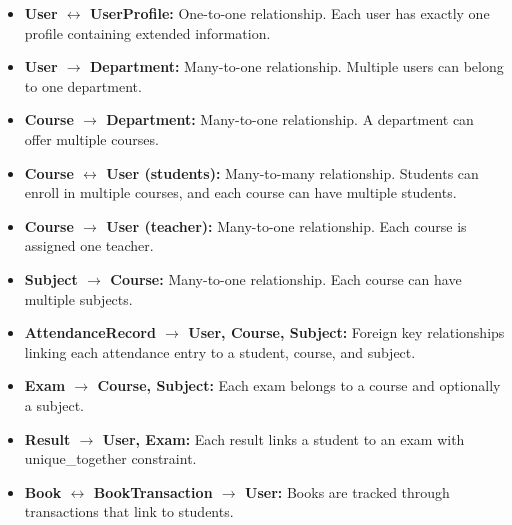 \begin{itemize}[leftmargin=2em]
    \item \textbf{User $\leftrightarrow$ UserProfile:} One-to-one relationship. Each user has exactly one profile containing extended information.
    
    \item \textbf{User $\rightarrow$ Department:} Many-to-one relationship. Multiple users can belong to one department.
    
    \item \textbf{Course $\rightarrow$ Department:} Many-to-one relationship. A department can offer multiple courses.
    
    \item \textbf{Course $\leftrightarrow$ User (students):} Many-to-many relationship. Students can enroll in multiple courses, and each course can have multiple students.
    
    \item \textbf{Course $\rightarrow$ User (teacher):} Many-to-one relationship. Each course is assigned one teacher.
    
    \item \textbf{Subject $\rightarrow$ Course:} Many-to-one relationship. Each course can have multiple subjects.
    
    \item \textbf{AttendanceRecord $\rightarrow$ User, Course, Subject:} Foreign key relationships linking each attendance entry to a student, course, and subject.
    
    \item \textbf{Exam $\rightarrow$ Course, Subject:} Each exam belongs to a course and optionally a subject.
    
    \item \textbf{Result $\rightarrow$ User, Exam:} Each result links a student to an exam with unique\_together constraint.
    
    \item \textbf{Book $\leftrightarrow$ BookTransaction $\rightarrow$ User:} Books are tracked through transactions that link to students.
\end{itemize}

